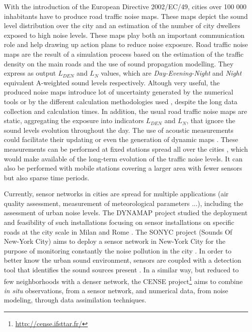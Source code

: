 \documentclass[twocolumn,a4paper,10pt]{article}
\begin{document}
With the introduction of the European Directive 2002/EC/49, cities over 100 000 inhabitants have to produce road traffic noise maps. These maps depict the sound level distribution over the city and an estimation of the number of city dwellers exposed to high noise levels. These maps play both an important communication role and help drawing up action plans to reduce noise exposure. Road traffic noise maps are the result of a simulation process based on the estimation of the traffic density on the main roads and the use of sound propagation modelling. They express as output $L_ {DEN}$ and $L_N$ values, which are \textit{Day-Evening-Night} and \textit{Night} equivalent A-weighted sound levels respectively. Altough very useful, the produced noise maps introduce lot of uncertainty generated by the numerical tools \cite{van_leeuwen_noise_2015} or by the different calculation methodologies used \cite{leroy_uncertainty_2010}\cite{garg_critical_2014}, despite the long data collection and calculation times. In addition, the usual road traffic noise maps are static, aggregating the exposure into indicators $L_{DEN}$ and $L_N$, that ignore the sound levels evolution throughout the day.
The use of acoustic measurements could facilitate their updating or even the generation of dynamic maps \cite{wei_dynamic_2016}. These measurements can be performed at fixed stations spread all over the cities \cite{Mioduszewski} \cite{mietlicki2012innovative}, which would make available of the long-term evolution of the traffic noise levels. It can also be performed with  mobile stations \cite{can_exploring_2012} \cite{manvell2004sadmam} covering a larger area with fewer sensors but also sparse time periods.

Currently, sensor networks in cities are spread for multiple applications (air quality assessment, measurement of meteorological parameters ...), including the assessment of urban noise levels. The DYNAMAP project \cite{dynamap_2016} studied the deployment and feasibility of such installations focusing on sensor installations on specific roads at the city scale in Milan and Rome \cite{bellucci_life_2017}.
The SONYC project (Sounds Of New-York City) aims to deploy a sensor network in New-York City for the purpose of monitoring constantly the noise pollution in the city \cite{mydlarz2017implementation}. In order to better know the urban sound environment, sensors are coupled with a detection tool that identifies the sound sources present \cite{salamon2017deep}. In a similar way, but reduced to few neighborhoods with a denser network, the CENSE project\footnote{\url{http://cense.ifsttar.fr/}} \cite{picaut2017characterization} aims to combine \textit{in situ} observations, from a sensor network, and numerical data, from noise modeling, through data assimilation techniques.
\end{document}
